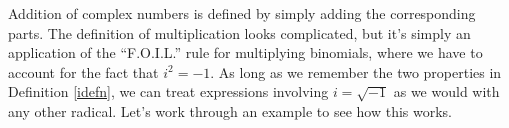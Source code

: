 \smallskip


\smallskip


\smallskip

Addition of complex numbers is defined by simply adding the corresponding parts. The definition of multiplication looks complicated, but it's simply an application of the ``F.O.I.L.'' rule for multiplying binomials, where we have to account for the fact that $i^2=-1$.
 As long as we remember the two properties in Definition \ref{idefn}, we can treat expressions involving $i=\sqrt{-1}$ as we would with any other radical.
Let's work through an example to see how this works.

\medskip


